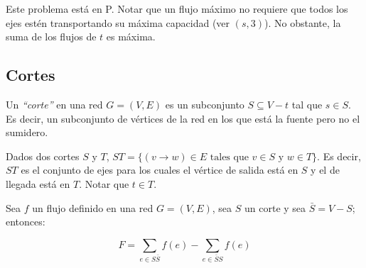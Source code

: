 \raggedright
  \bigskip
  \begin{center}
\end{center}

Este problema est\'a en P. Notar que un flujo m\'aximo no requiere que todos los ejes est\'en transportando su m\'axima capacidad (ver $(s,3)$). No obstante, la suma de los flujos de $t$ es m\'axima.

\newpage
\subsection{Cortes}

Un \emph{``corte''} en una red $G = (V, E)$ es un subconjunto $S \subseteq V - {t}$ tal que $s \in S$. Es decir, un subconjunto de v\'ertices de la red en los que est\'a la fuente pero no el sumidero.

Dados dos cortes $S$ y $T$, $ST = \{ (v \rightarrow w) \in E \textrm{ tales que } v \in S \textrm{ y } w \in T \}$. Es decir, $ST$ es el conjunto de ejes para los cuales el v\'ertice de salida est\'a en $S$ y el de llegada est\'a en $T$. Notar que $t \in T$. 

Sea $f$ un flujo definido en una red $G = (V, E)$, sea $S$ un corte y sea $\bar{S} = V - S$; entonces:

\[
F = \sum_{e \in S\bar{S}} f(e) - \sum_{e \in \bar{S}S} f(e)
\]

